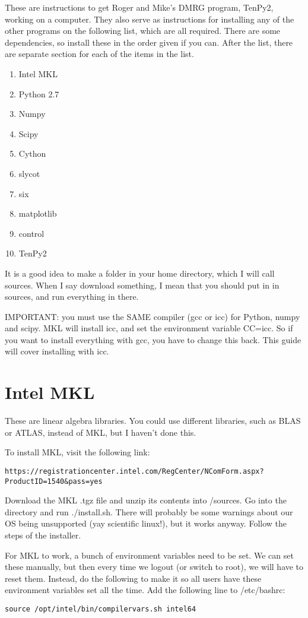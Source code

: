 
These are instructions to get Roger and Mike's DMRG program, TenPy2, working on a computer. They also serve as instructions for installing any of the other programs on the following list, which are all required. There are some dependencies, so install these in the order given if you can. After the list, there are separate section for each of the items in the list.
\begin{enumerate}
\item Intel MKL
\item Python 2.7
\item Numpy
\item Scipy
\item Cython
\item slycot
\item six
\item matplotlib
\item control
\item TenPy2
\end{enumerate}

It is a good idea to make a folder in your home directory, which I will call sources. When I say download something, I mean that you should put in in sources, and run everything in there.

IMPORTANT: you must use the SAME compiler (gcc or icc) for Python, numpy and scipy. MKL will install icc, and set the environment variable CC=icc. So if you want to install everything with gcc, you have to change this back. This guide will cover installing with icc.

\section{Intel MKL}
These are linear algebra libraries. You could use different libraries, such as BLAS or ATLAS, instead of MKL, but I haven't done this. 


To install MKL, visit the following link:
\begin{verbatim}
https://registrationcenter.intel.com/RegCenter/NComForm.aspx?ProductID=1540&pass=yes
\end{verbatim}

Download the MKL .tgz file and unzip its contents into /sources. Go into the directory and run ./install.sh. There will probably be some warnings about our OS being unsupported (yay scientific linux!), but it works anyway. Follow the steps of the installer.

For MKL to work, a bunch of environment variables need to be set. We can set these manually, but then every time we logout (or switch to root), we will have to reset them. Instead, do the following to make it so all users have these environment variables set all the time. Add the following line to /etc/bashrc:
\begin{verbatim}
source /opt/intel/bin/compilervars.sh intel64
\end{verbatim}

